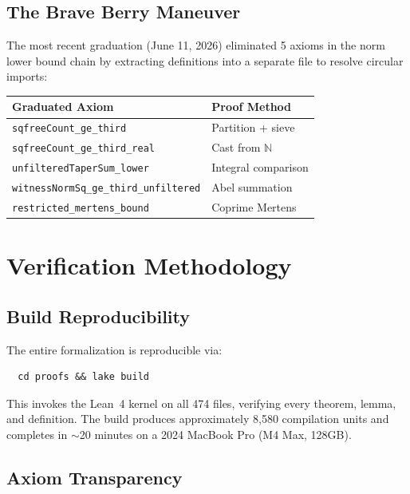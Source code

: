 \documentclass[11pt,a4paper]{article}
\theoremstyle{definition}
\newcommand{\lean}[1]{\texttt{#1}}
\begin{document}
\subsection{The Brave Berry Maneuver}

The most recent graduation (June 11, 2026) eliminated 5 axioms in the
norm lower bound chain by extracting definitions into a separate file
to resolve circular imports:

\begin{center}
\begin{tabular}{@{}ll@{}}
\toprule
\textbf{Graduated Axiom} & \textbf{Proof Method} \\
\midrule
\lean{sqfreeCount\_ge\_third} & Partition + sieve \\
\lean{sqfreeCount\_ge\_third\_real} & Cast from $\mathbb{N}$ \\
\lean{unfilteredTaperSum\_lower} & Integral comparison \\
\lean{witnessNormSq\_ge\_third\_unfiltered} & Abel summation \\
\lean{restricted\_mertens\_bound} & Coprime Mertens \\
\bottomrule
\end{tabular}
\end{center}

\section{Verification Methodology}
\label{sec:verification}

\subsection{Build Reproducibility}

The entire formalization is reproducible via:
\begin{verbatim}
  cd proofs && lake build
\end{verbatim}
This invokes the Lean~4 kernel on all 474 files, verifying
every theorem, lemma, and definition. The build produces
approximately 8,580 compilation units and completes in
$\sim$20 minutes on a 2024 MacBook Pro (M4 Max, 128GB).

\subsection{Axiom Transparency}
\end{document}
